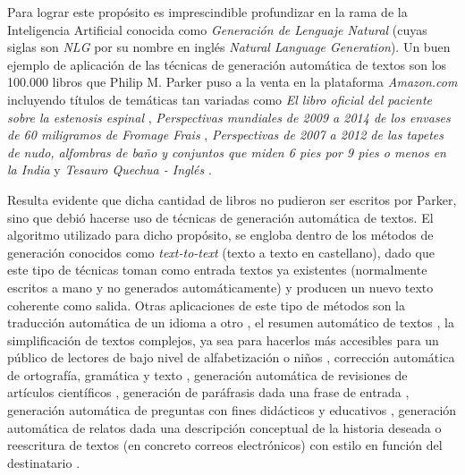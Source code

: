 Para lograr este propósito es imprescindible profundizar en la rama de la Inteligencia Artificial conocida como \textit{Generación de Lenguaje Natural} (cuyas siglas son \textit{NLG} por su nombre en inglés \textit{Natural Language Generation}). Un buen ejemplo de aplicación de las técnicas de generación automática de textos son los 100.000 libros que Philip M. Parker puso a la venta en la plataforma \textit{Amazon.com} incluyendo títulos de temáticas tan variadas como \textit{El libro oficial del paciente sobre la estenosis espinal} \citep{parker2002official}, \textit{Perspectivas mundiales de 2009 a 2014 de los envases de 60 miligramos de Fromage Frais} \citep{parkerfromage},  \textit{Perspectivas de 2007 a 2012 de las tapetes de nudo, alfombras de baño y conjuntos que miden 6 pies por 9 pies o menos en la India} \citep{parkerrugs} y \textit{Tesauro Quechua - Inglés} \citep{parkerquechua}.

Resulta evidente que dicha cantidad de libros no pudieron ser escritos por Parker, sino que debió hacerse uso de técnicas de generación automática de textos. El algoritmo utilizado para dicho propósito, se engloba dentro de los métodos de generación conocidos como \textit{text-to-text} (texto a texto en castellano), dado que este tipo de técnicas toman como entrada textos ya existentes (normalmente escritos a mano y no generados automáticamente) y producen un nuevo texto coherente como salida. Otras aplicaciones de este tipo de métodos son la traducción automática de un idioma a otro \citep{hutchins2009introduction, oettinger2013automatic}, el resumen automático de textos \citep{mani2001automatic, nenkova2011automatic}, la simplificación de textos complejos, ya sea para hacerlos más accesibles para un público de lectores de bajo nivel de alfabetización \citep{siddharthan2014survey, bautista2011empirical} o niños \citep{macdonald2016summarising}, corrección automática de ortografía, gramática y texto \citep{kukich1992techniques, ng2014conll}, generación automática de revisiones de artículos científicos \citep{bartoli2016your}, generación de paráfrasis dada una frase de entrada \citep{bannard2005paraphrasing}, generación automática de preguntas con fines didácticos y educativos \citep{brown2005automatic}, generación automática de relatos dada una descripción conceptual de la historia deseada \citep{gervas2004story} o reescritura de textos (en concreto correos electrónicos) con estilo en función del destinatario \citep{mitfg}.

